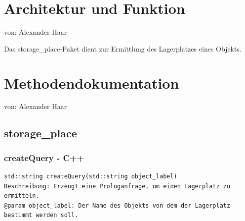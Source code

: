 \documentclass{suturo}
\begin{document}

\makeatletter
\newcommand{\chapterauthor}[1]{%
  {\parindent0pt\vspace*{-47pt}%
  \linespread{2.2}\large\begin{flushright}von: #1\end{flushright}%
  \par\nobreak\vspace*{0pt}}
  \@afterheading%
}
\makeatother

\section*{Architektur und Funktion}
\chapterauthor{Alexander Haar}
Das storage\_place-Paket dient zur Ermittlung des Lagerplatzes eines Objekts.

\begin{figure}[!htb]
\end{figure}
      
\section*{Methodendokumentation}
\chapterauthor{Alexander Haar}

\subsection{storage\_place}

\subsubsection{createQuery - C++}
\begin{verbatim}
std::string createQuery(std::string object_label)
Beschreibung: Erzeugt eine Prologanfrage, um einen Lagerplatz zu ermitteln.
@param object_label: Der Name des Objekts von dem der Lagerplatz bestimmt werden soll.
\end{verbatim}\label{func:segmentplanes}
\end{document}
